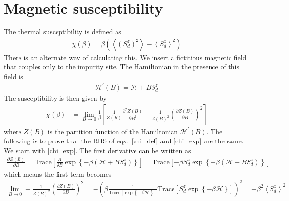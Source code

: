 \documentclass[twoside]{report}
\numberwithin{equation}{section}
\begin{document}
\section{Magnetic susceptibility}
The thermal susceptibility is defined as
\begin{equation}\begin{aligned}
	\label{chi_def}
	\chi(\beta) = \beta \left(\left<\left(S_d^z\right)^2\right> - \left<S_d^z\right>^2\right)
\end{aligned}\end{equation}
There is an alternate way of calculating this. We insert a fictitious magnetic field that couples only to the impurity site. The Hamiltonian in the presence of this field is
\begin{equation}\begin{aligned}
	\mathcal{H}^\prime(B) = \mathcal{H} + B S_d^z
\end{aligned}\end{equation}
The susceptibility is then given by
\begin{equation}\begin{aligned}
	\label{chi_exp}
	\chi(\beta) &= \lim_{B \to 0}\frac{1}{\beta}\left[\frac{1}{Z(B)} \frac{\partial^2{Z(B)}}{\partial{B^2}}-\frac{1}{Z(B)^2} \left(\frac{\partial{Z(B)}}{\partial{B}}\right)^2\right]
\end{aligned}\end{equation}
where \(Z(B)\) is the partition function of the Hamiltonian \(\mathcal{H}^\prime(B)\). The following is to prove that the RHS of eqs.~\ref{chi_def} and \ref{chi_exp} are the same. We start with \ref{chi_exp}. The first derivative can be written as
\begin{equation}\begin{aligned}
	\frac{\partial{Z(B)}}{\partial{B}} = \text{Trace}\left[\frac{\partial{}}{\partial{B}} \exp\left\{-\beta\left( \mathcal{H} + BS_d^z \right) \right\}\right] = \text{Trace}\left[-\beta S_d^z \exp\left\{-\beta\left( \mathcal{H} + BS_d^z \right) \right\}\right]
\end{aligned}\end{equation}
which means the first term becomes
\begin{equation}\begin{aligned}
	\lim_{B \to 0}-\frac{1}{Z(B)^2} \left(\frac{\partial{Z(B)}}{\partial{B}}\right)^2 = -\left(\beta \frac{1}{\text{Trace}\left[\exp\left\{-\beta\mathcal{H}\right\}\right]} \text{Trace}\left[S_d^z \exp\left\{-\beta\mathcal{H}\right\}\right]\right)^2 = -\beta^2 \left<S_d^z\right>^2
\end{aligned}\end{equation}
\end{document}
